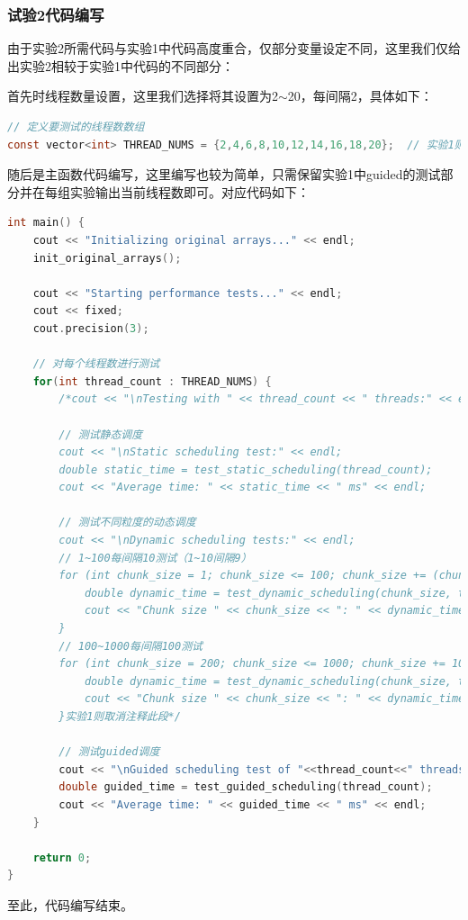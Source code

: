 \documentclass{nku}
\begin{document}
\subsubsection{试验2代码编写}
由于实验2所需代码与实验1中代码高度重合，仅部分变量设定不同，这里我们仅给出实验2相较于实验1中代码的不同部分：

首先时线程数量设置，这里我们选择将其设置为2$\sim$20，每间隔2，具体如下：
\begin{lstlisting}[language=C]
// 定义要测试的线程数数组
const vector<int> THREAD_NUMS = {2,4,6,8,10,12,14,16,18,20};  // 实验1则设定为const vector<int> THREAD_NUMS = {4}即可
\end{lstlisting}

随后是主函数代码编写，这里编写也较为简单，只需保留实验1中guided的测试部分并在每组实验输出当前线程数即可。对应代码如下：
\begin{lstlisting}[language=C]
int main() {
    cout << "Initializing original arrays..." << endl;
    init_original_arrays();

    cout << "Starting performance tests..." << endl;
    cout << fixed;
    cout.precision(3);

    // 对每个线程数进行测试
    for(int thread_count : THREAD_NUMS) {
        /*cout << "\nTesting with " << thread_count << " threads:" << endl;

        // 测试静态调度
        cout << "\nStatic scheduling test:" << endl;
        double static_time = test_static_scheduling(thread_count);
        cout << "Average time: " << static_time << " ms" << endl;

        // 测试不同粒度的动态调度
        cout << "\nDynamic scheduling tests:" << endl;
        // 1~100每间隔10测试（1~10间隔9）
        for (int chunk_size = 1; chunk_size <= 100; chunk_size += (chunk_size < 10 ? 9 : 10)) {
            double dynamic_time = test_dynamic_scheduling(chunk_size, thread_count);
            cout << "Chunk size " << chunk_size << ": " << dynamic_time << " ms" << endl;
        }
        // 100~1000每间隔100测试
        for (int chunk_size = 200; chunk_size <= 1000; chunk_size += 100) {
            double dynamic_time = test_dynamic_scheduling(chunk_size, thread_count);
            cout << "Chunk size " << chunk_size << ": " << dynamic_time << " ms" << endl;
        }实验1则取消注释此段*/

        // 测试guided调度
        cout << "\nGuided scheduling test of "<<thread_count<<" threads" << endl;
        double guided_time = test_guided_scheduling(thread_count);
        cout << "Average time: " << guided_time << " ms" << endl;
    }

    return 0;
}
\end{lstlisting}
至此，代码编写结束。
\end{document}

